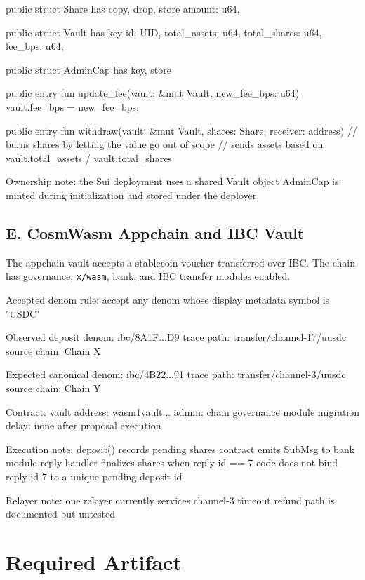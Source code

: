 \begin{codeblock}
public struct Share has copy, drop, store {
    amount: u64,
}

public struct Vault has key {
    id: UID,
    total_assets: u64,
    total_shares: u64,
    fee_bps: u64,
}

public struct AdminCap has key, store {}

public entry fun update_fee(vault: &mut Vault, new_fee_bps: u64) {
    vault.fee_bps = new_fee_bps;
}

public entry fun withdraw(vault: &mut Vault, shares: Share, receiver: address) {
    // burns shares by letting the value go out of scope
    // sends assets based on vault.total_assets / vault.total_shares
}

Ownership note:
    the Sui deployment uses a shared Vault object
    AdminCap is minted during initialization and stored under the deployer
\end{codeblock}

\subsection*{E. CosmWasm Appchain and IBC Vault}

The appchain vault accepts a stablecoin voucher transferred over IBC. The chain has governance, \texttt{x/wasm}, bank, and IBC transfer modules enabled.

\begin{codeblock}
Accepted denom rule:
    accept any denom whose display metadata symbol is "USDC"

Observed deposit denom:
    ibc/8A1F...D9
    trace path: transfer/channel-17/uusdc
    source chain: Chain X

Expected canonical denom:
    ibc/4B22...91
    trace path: transfer/channel-3/uusdc
    source chain: Chain Y

Contract:
    vault address: wasm1vault...
    admin: chain governance module
    migration delay: none after proposal execution

Execution note:
    deposit() records pending shares
    contract emits SubMsg to bank module
    reply handler finalizes shares when reply id == 7
    code does not bind reply id 7 to a unique pending deposit id

Relayer note:
    one relayer currently services channel-3
    timeout refund path is documented but untested
\end{codeblock}

\section*{Required Artifact}

